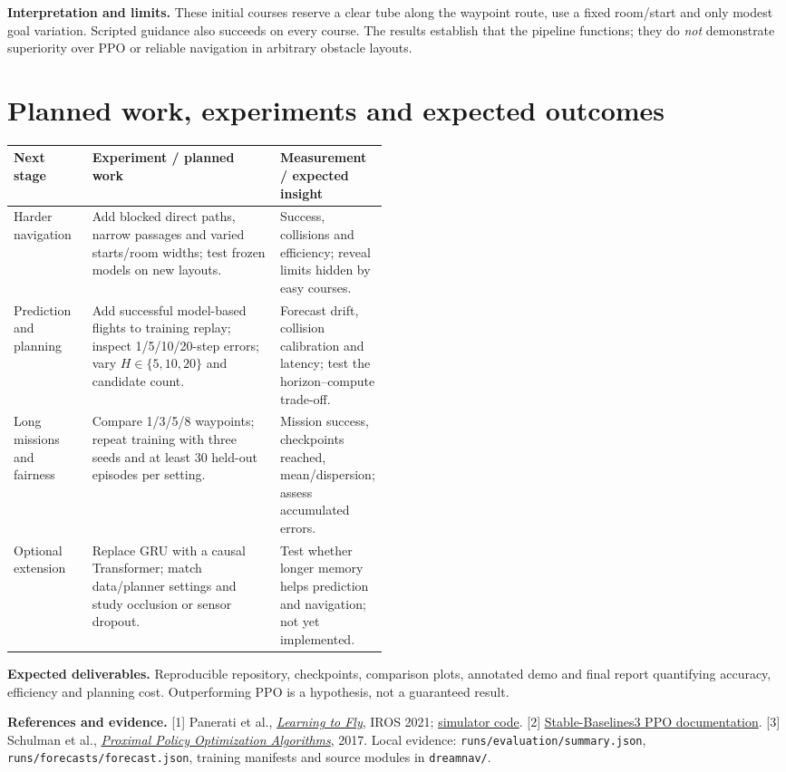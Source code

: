 \documentclass[10pt,a4paper]{article}
\begin{document}
\textbf{Interpretation and limits.} These initial courses reserve a clear tube along the waypoint route, use a fixed room/start and only modest goal variation. Scripted guidance also succeeds on every course. The results establish that the pipeline functions; they do \emph{not} demonstrate superiority over PPO or reliable navigation in arbitrary obstacle layouts.

\section{Planned work, experiments and expected outcomes}
\begin{tabularx}{\linewidth}{@{}>{\raggedright\arraybackslash}p{0.21\linewidth}Y>{\raggedright\arraybackslash}p{0.27\linewidth}@{}}
\toprule
\textbf{Next stage} & \textbf{Experiment / planned work} & \textbf{Measurement / expected insight} \\
\midrule
Harder navigation & Add blocked direct paths, narrow passages and varied starts/room widths; test frozen models on new layouts. & Success, collisions and efficiency; reveal limits hidden by easy courses. \\
Prediction and planning & Add successful model-based flights to training replay; inspect 1/5/10/20-step errors; vary $H\in\{5,10,20\}$ and candidate count. & Forecast drift, collision calibration and latency; test the horizon--compute trade-off. \\
Long missions and fairness & Compare 1/3/5/8 waypoints; repeat training with three seeds and at least 30 held-out episodes per setting. & Mission success, checkpoints reached, mean/dispersion; assess accumulated errors. \\
Optional extension & Replace GRU with a causal Transformer; match data/planner settings and study occlusion or sensor dropout. & Test whether longer memory helps prediction and navigation; not yet implemented. \\
\bottomrule
\end{tabularx}
\textbf{Expected deliverables.} Reproducible repository, checkpoints, comparison plots, annotated demo and final report quantifying accuracy, efficiency and planning cost. Outperforming PPO is a hypothesis, not a guaranteed result.

\vspace{3pt}
{\footnotesize\color{muted}
\textbf{References and evidence.}
[1] Panerati et al., \href{https://arxiv.org/abs/2103.02142}{\emph{Learning to Fly}}, IROS 2021; \href{https://github.com/learnsyslab/gym-pybullet-drones}{simulator code}.
[2] \href{https://stable-baselines3.readthedocs.io/en/master/modules/ppo.html}{Stable-Baselines3 PPO documentation}.
[3] Schulman et al., \href{https://arxiv.org/abs/1707.06347}{\emph{Proximal Policy Optimization Algorithms}}, 2017.
Local evidence: \texttt{runs/evaluation/summary.json}, \texttt{runs/forecasts/forecast.json}, training manifests and source modules in \texttt{dreamnav/}.}
\end{document}
